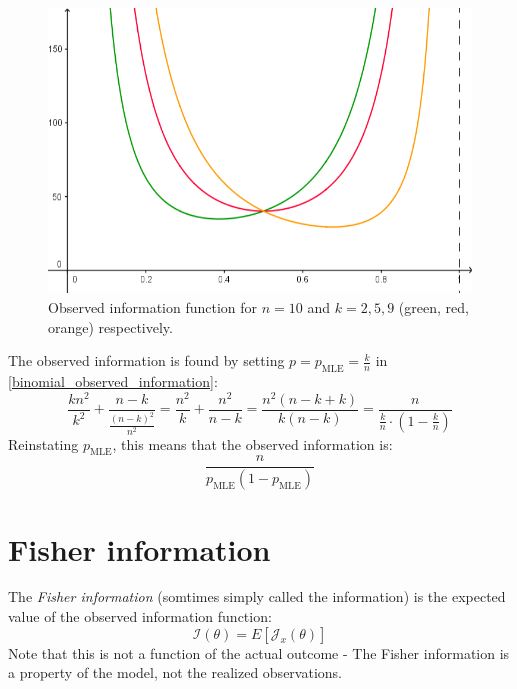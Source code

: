 \documentclass[12pt, a4paper]{article}
\numberwithin{equation}{section}
\begin{document}
\begin{figure}
\centering
\includegraphics[width=.8\textwidth]{binomial_observed_information}
\caption{Observed information function for $n=10$ and $k=2, 5, 9$ (green, red, orange) respectively.}
\label{fig:binomial_observed_information}
\end{figure}

The observed information is found by setting $p=p_{\textrm{MLE}}=\frac{k}{n}$ in \ref{binomial_observed_information}:
\begin{equation}
\frac{kn^2}{k^2}+\frac{n-k}{\frac{(n-k)^2}{n^2}}=\frac{n^2}{k}+\frac{n^2}{n-k}=\frac{n^2(n-k+k)}{k(n-k)}=\frac{n}{\frac{k}{n}\cdot\left(1-\frac{k}{n}\right)}
\end{equation}
Reinstating $p_{\textrm{MLE}}$, this means that the observed information is:
\begin{equation}
\frac{n}{p_{\textrm{MLE}}(1-p_{\textrm{MLE}})}
\end{equation}

\section{Fisher information}
The \textit{Fisher information} (somtimes simply called the information) is the expected value of the observed information function:
\begin{equation}
\mathcal{I}(\theta)=E[\mathcal{J}_x(\theta)]
\end{equation}
Note that this is not a function of the actual outcome - The Fisher information is a property of the model, not the realized observations.
\end{document}
